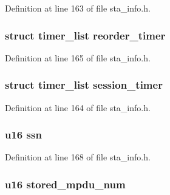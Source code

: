 Definition at line 163 of file sta\-\_\-info.\-h.

\hypertarget{structtid__ampdu__rx_a53b375729eed85a579140f1ba58dae16}{
\subsubsection[{reorder\-\_\-timer}]{\setlength{\rightskip}{0pt plus 5cm}struct timer\-\_\-list reorder\-\_\-timer}}\label{structtid__ampdu__rx_a53b375729eed85a579140f1ba58dae16}


Definition at line 165 of file sta\-\_\-info.\-h.

\hypertarget{structtid__ampdu__rx_a96b57b74220e5b5898ffd791809d9dfe}{
\subsubsection[{session\-\_\-timer}]{\setlength{\rightskip}{0pt plus 5cm}struct timer\-\_\-list session\-\_\-timer}}\label{structtid__ampdu__rx_a96b57b74220e5b5898ffd791809d9dfe}


Definition at line 164 of file sta\-\_\-info.\-h.

\hypertarget{structtid__ampdu__rx_af1c6bb9db8bba4a7e89d3f6896847adc}{
\subsubsection[{ssn}]{\setlength{\rightskip}{0pt plus 5cm}u16 ssn}}\label{structtid__ampdu__rx_af1c6bb9db8bba4a7e89d3f6896847adc}


Definition at line 168 of file sta\-\_\-info.\-h.

\hypertarget{structtid__ampdu__rx_af841b3070ad65b70ebaccb5d7d3349d3}{
\subsubsection[{stored\-\_\-mpdu\-\_\-num}]{\setlength{\rightskip}{0pt plus 5cm}u16 stored\-\_\-mpdu\-\_\-num}}\label{structtid__ampdu__rx_af841b3070ad65b70ebaccb5d7d3349d3}



